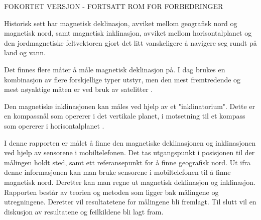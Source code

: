 FOKORTET VERSJON - FORTSATT ROM FOR FORBEDRINGER \newline

Historisk sett har magnetisk deklinasjon, avviket mellom geografisk nord og magnetisk nord, samt magnetisk inklinasjon, avviket mellom horisontalplanet og den jordmagnetiske feltvektoren gjort det litt vanskeligere å navigere seg rundt på land og vann.

Det finnes flere måter å måle magnetisk deklinasjon på. I dag brukes en kombinasjon av flere forskjellige typer utstyr, men den mest fremtredende og mest nøyaktige måten er ved bruk av satelitter \cite{World_magnetic_model}.

Den magnetiske inklinasjonen kan måles ved hjelp av et "inklinatorium". Dette er en kompassnål som opererer i det vertikale planet, i motsetning til et kompass som opererer i horisontalplanet \cite{inklinometer}.

I denne rapporten er målet å finne den magnetiske deklinasjonen og inklinasjonen ved hjelp av sensorene i mobiltelefonen. Det tas utgangspunkt i posisjonen til der målingen holdt sted, samt ett referansepunkt for å finne geografisk nord. Ut ifra denne informasjonen kan man bruke sensorene i mobiltelefonen til å finne magnetisk nord. Deretter kan man regne ut magnetisk deklinasjon og inklinasjon. Rapporten består av teorien og metoden som ligger bak målingene og utregningene. Deretter vil resultatetene for målingene bli fremlagt. Til slutt vil en diskusjon av resultatene og feilkildene bli lagt fram. 
